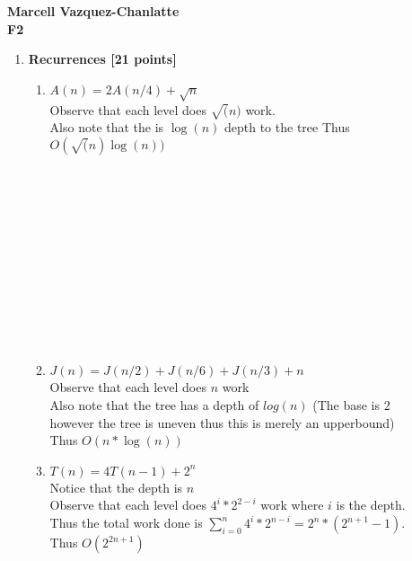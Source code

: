 \documentclass[12pt]{article}
\begin{document}
\begin{center}
{\LARGE
\textbf{Marcell Vazquez-Chanlatte}
\\
\textbf{F2}
\\[1ex]}
\end{center}

\begin{enumerate}

\item
\textbf{Recurrences [21 points]}

\begin{enumerate}
\item $A(n)=2A(n/4) + \sqrt{n}$\\
  Observe that each level does $\sqrt(n)$ work.\\
  Also note that the is $\log(n)$ depth to the tree
  Thus  $O(\sqrt(n) \log(n))$\\
\\\\\\\\\\\\\\\\\\\\\\
\item $J(n)=J(n/2) + J(n/6) + J(n/3) + n$\\
  Observe that each level does $n$ work\\
  Also note that the tree has a depth of $log(n)$ (The base is $2$\\
  however the tree is uneven thus this is merely an upperbound)\\
  Thus $O(n*\log(n))$
  \newpage
\item $T(n)=4T(n-1)+2^n$\\
  Notice that the depth is $n$\\
  Observe that each level does $4^i*2^{2-i}$ work where $i$ is the depth.\\
  Thus the total work done is $\displaystyle\sum\limits_{i=0}^n
  4^i*2^{n-i} = 2^n*(2^{n+1} -1)$.\\
  Thus $O(2^{2n+1})$

\end{enumerate}
\end{enumerate}
\end{document}
